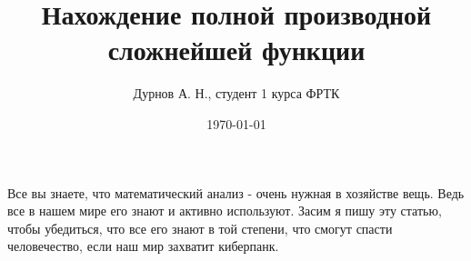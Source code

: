 \title{Нахождение полной производной сложнейшей функции}
\author{Дурнов А. Н., студент 1 курса ФРТК}
\date{\today}
\maketitle

Все вы знаете, что математический анализ - очень нужная в хозяйстве вещь. Ведь все в нашем мире его знают и активно используют. Засим я пишу эту статью, чтобы убедиться, что все его знают в той степени, что смогут спасти человечество, если наш мир захватит киберпанк. 
\\

